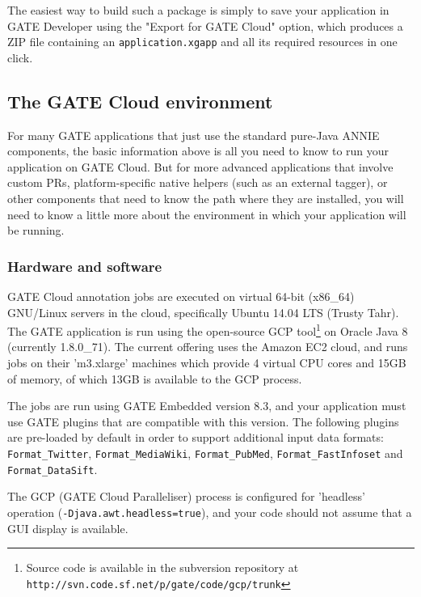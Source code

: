 The easiest way to build such a package is simply to save your application in
GATE Developer using the "Export for GATE Cloud" option, which produces a ZIP
file containing an {\tt application.xgapp} and all its required resources in one
click.

\subsection{The GATE Cloud environment}

For many GATE applications that just use the standard pure-Java ANNIE
components, the basic information above is all you need to know to run your
application on GATE Cloud.  But for more advanced applications that involve
custom PRs, platform-specific native helpers (such as an external tagger), or
other components that need to know the path where they are installed, you will
need to know a little more about the environment in which your application will
be running.

\subsubsection{Hardware and software}

GATE Cloud annotation jobs are executed on virtual 64-bit (x86\_64) GNU/Linux
servers in the cloud, specifically Ubuntu 14.04 LTS (Trusty Tahr).  The GATE
application is run using the open-source GCP tool\footnote{Source code is
  available in the subversion repository at\\
  {\tt http://svn.code.sf.net/p/gate/code/gcp/trunk}} on Oracle Java 8
(currently 1.8.0\_71).  The current offering uses the Amazon EC2 cloud, and runs
jobs on their 'm3.xlarge' machines which provide 4 virtual CPU cores and 15GB of
memory, of which 13GB is available to the GCP process.

The jobs are run using GATE Embedded version 8.3, and your application must use
GATE plugins that are compatible with this version. The following plugins are
pre-loaded by default in order to support additional input data formats:
\verb!Format_Twitter!, \verb!Format_MediaWiki!, \verb!Format_PubMed!,
\verb!Format_FastInfoset! and \verb!Format_DataSift!.

The GCP (GATE Cloud Paralleliser) process is configured for 'headless' operation
(\verb^-Djava.awt.headless=true^), and your code should not assume that a GUI
display is available.

